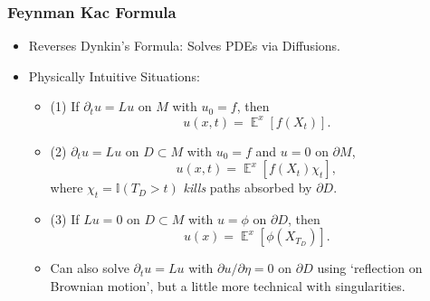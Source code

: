 \documentclass[usenames,dvipsnames,12pt]{beamer}
\DeclareMathOperator{\EE}{\mathbb{E}}
\begin{document}
\begin{frame}
    \frametitle{Feynman Kac Formula}

    \begin{itemize}
        \item Reverses Dynkin's Formula: Solves PDEs via Diffusions.

        \item Physically Intuitive Situations:
        \begin{itemize}
            \item (1) If $\partial_t u = Lu$ on $M$ with $u_0 = f$, then
            \[ u(x,t) = \EE^x[f(X_t)]. \]

            \item (2) $\partial_t u = Lu$ on $D \subset M$ with $u_0 = f$ and $u = 0$ on $\partial M$,
            \[ u(x,t) = \EE^x[f(X_t) \chi_t], \]
            where $\chi_t = \mathbb{I}(T_D > t)$ \emph{kills} paths absorbed by $\partial D$.

            \item (3) If $Lu = 0$ on $D \subset M$ with $u = \phi$ on $\partial D$, then
            \[ u(x) = \EE^x \left[ \phi(X_{T_D}) \right]. \]

            \item Can also solve $\partial_t u = Lu$ with $\partial u / \partial \eta = 0$ on $\partial D$ using `reflection on Brownian motion', but a little more technical with singularities.
        \end{itemize}
    \end{itemize}
\end{frame}
\end{document}
